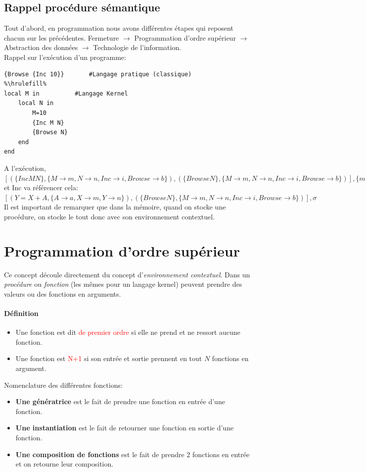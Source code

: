 \documentclass{report}
\begin{document}
\section{Rappel procédure sémantique}
Tout d'abord, en programmation nous avons différentes étapes qui reposent chacun sur les précédentes. Fermeture $\rightarrow$ Programmation d'ordre supérieur $\rightarrow$ Abstraction des données $\rightarrow$ Technologie de l'information.\\

Rappel sur l'exécution d'un programme:
\begin{lstlisting}[escapechar=\%]
{Browse {Inc 10}}		#Langage pratique (classique)
%\hrulefill%
local M in		 	#Langage Kernel
	local N in
		M=10
		{Inc M N}
		{Browse N}
	end
end
\end{lstlisting}
A l'exécution,$[(\{Inc M N\},\{M\rightarrow m,N \rightarrow n,Inc \rightarrow i,Browse \rightarrow b\}), (\{Browse N\},\{M \rightarrow m,N \rightarrow n,Inc \rightarrow i,Browse \rightarrow b\})],
\{m=10,n,i=(proc \{\$ X Y\} Y=X+A end, \{A \rightarrow a\}), a=1,b=(... browser code…)\}$ et Inc va référencer cela:\\
$[(Y=X+A,\{A\rightarrow a,X \rightarrow m,Y \rightarrow n\}), (\{Browse N\},\{M \rightarrow m,N \rightarrow n,Inc \rightarrow i,Browse \rightarrow b\})],
\sigma$\\
Il est important de remarquer que dans la mémoire, quand on stocke une procédure, on stocke le tout donc avec son environnement contextuel.


\chapter{Programmation d'ordre supérieur}
Ce concept découle directement du concept d'\textit{environnement contextuel}. Dans un \textit{procédure} ou \textit{fonction} (les mêmes pour un langage kernel) peuvent prendre des valeurs ou des fonctions en arguments.
\subsubsection{Définition}
\begin{itemize}
\item Une fonction est dit \textcolor{red}{de premier ordre} si elle ne prend et ne ressort aucune fonction.
\item Une fonction est \textcolor{red}{N+1} si son entrée et sortie prennent en tout $N$ fonctions en argument.
\end{itemize}
Nomenclature des différentes fonctions:
\begin{itemize}
\item \textbf{Une génératrice} est le fait de prendre une fonction en entrée d'une fonction.
\item \textbf{Une instantiation} est le fait de retourner une fonction en sortie d'une fonction.
\item \textbf{Une composition de fonctions} est le fait de prendre 2 fonctions en entrée et on retourne leur composition.
\end{itemize}
\end{document}
